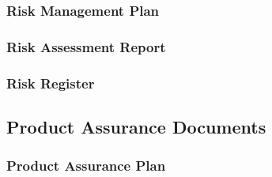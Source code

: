 \subsubsection{Risk Management Plan}
\label{app:Risk Management Plan}

\subsubsection{Risk Assessment Report}
\label{app:Risk Assessment Report}

\subsubsection{Risk Register}
\label{app:Risk Register}

\clearpage
\subsection{Product Assurance Documents}

\subsubsection{Product Assurance Plan}
\label{app:Product Assurance Plan}

